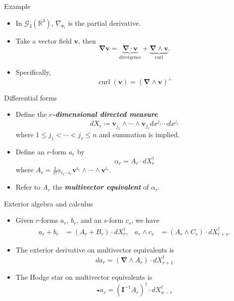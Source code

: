 \documentclass[aspectratio=169]{beamer}
\newcommand\boldgreen[1]{\textcolor{lighter_csu_green}{\emph{\textbf{#1}}}}
\newcommand{\R}{\mathbb{R}}
\newcommand{\grad}{\boldsymbol{\nabla}}
\newcommand{\G}{\mathcal{G}}
\newcommand{\blade}[1]{\boldsymbol{#1}}
\newcommand{\pseudoscalar}{\blade{I}}
\begin{document}
\begin{frame}{Example}
\vfill
\begin{itemize}
\pause
\item In $\G_3(\R^3)$, $\nabla_{\blade{e}_i}$ is the partial derivative.
\pause
\item Take a vector field $\blade{v}$, then
    \[
    \grad \blade{v} = \underbrace{\grad \cdot \blade{v}}_{\textrm{divergence}} + \underbrace{\grad \wedge \blade{v}}_{\textrm{curl}}.
    \]
\pause
\item Specifically,
\[
    \operatorname{curl}(\blade{v}) = (\grad \wedge \blade{v})^\perp
\]
\end{itemize}
\vfill
\end{frame}

\begin{frame}{Differential forms}
\vfill
\begin{itemize}
    \pause
    \item Define the \boldgreen{$r$-dimensional directed measure}
    \[
    dX_r\coloneqq \blade{v}_{j_1} \wedge \cdots \wedge \blade{v}_{j_r} dx^{j_1} \cdots dx^{j_r}
    \] 
    where $1\leq j_1<\cdots<j_r\leq n$ and summation is implied. 
    \pause
    \item Define an $r$-form $a_r$ by
    \[
    \alpha_r = A_r \cdot dX_r^\dagger
    \]
    where $A_r = \frac{1}{r!} a_{i_1 \cdots i_r} \blade{v}^{i_1} \wedge \cdots \wedge \blade{v}^{i_r}$. 
    \pause
    \item Refer to $A_r$ the \boldgreen{multivector equivalent} of $\alpha_r$.
\end{itemize}
\vfill
\end{frame}

\begin{frame}{Exterior algebra and calculus}
\vfill
\begin{itemize}
\pause
\item Given $r$-forms $a_r$, $b_r$, and an $s$-form $c_s$, we have
\begin{align*}
a_r + b_r &= (A_r+B_r) \cdot dX_r^\dagger, & a_r \wedge c_s &= (A_r \wedge C_s) \cdot dX_{r+s}^\dagger.
\end{align*}
\vspace*{-0.25cm}
\pause
\item The exterior derivative on multivector equivalents is 
\[
da_r = (\grad \wedge A_r) \cdot dX_{r+1}^\dagger
\]
\pause
\vspace*{-0.25cm}
\item The Hodge star on multivector equivalents is
\[
\star a_r = (\pseudoscalar^{-1} A_r)^\dagger \cdot dX_{n-r}^\dagger
\]
\end{itemize}
\vfill
\end{frame}
\end{document}
